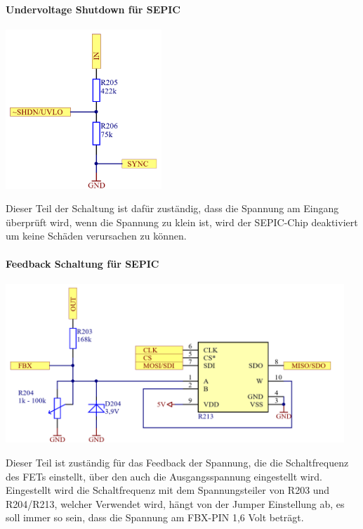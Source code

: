 \documentclass[paper=a4, 12pt]{scrreprt}
\begin{document}
			\paragraph{Undervoltage Shutdown für SEPIC}
			\begin{adjustbox}{center,caption={Undervoltage Shutdown Schaltung für LT3757},label={fig:uvlo},nofloat=figure,vspace=\bigskipamount}
				\includegraphics[height=6cm]{img/Undervolteage_Shutdown_SEPIC.PNG}
			\end{adjustbox}
			Dieser Teil der Schaltung ist dafür zuständig, dass die Spannung am Eingang überprüft wird, wenn die Spannung zu klein ist, wird der SEPIC-Chip deaktiviert um keine Schäden verursachen zu können.
			\pagebreak
			\paragraph{Feedback Schaltung für SEPIC}
			\begin{adjustbox}{center,caption={Feedback Schaltung für SEPIC},label={fig:feedback},nofloat=figure,vspace=\bigskipamount}
				\includegraphics[height=6cm]{img/Feedback_SEPIC.PNG}
			\end{adjustbox}
			Dieser Teil ist zuständig für das Feedback der Spannung, die die Schaltfrequenz des FETs einstellt, über den auch die Ausgangsspannung eingestellt wird. Eingestellt wird die Schaltfrequenz mit dem Spannungsteiler von R203 und R204/R213, welcher Verwendet wird, hängt von der Jumper Einstellung ab, es soll immer so sein, dass die Spannung am FBX-PIN 1,6 Volt beträgt.
			
\end{document}
